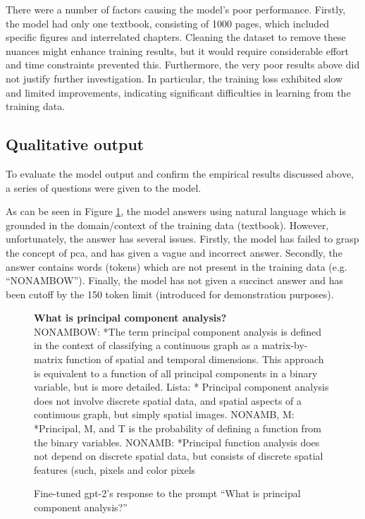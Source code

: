 There were a number of factors causing the model's poor performance. Firstly, the model had only one textbook, consisting of 1000 pages, which included specific figures and interrelated chapters. Cleaning the dataset to remove these nuances might enhance training results, but it would require considerable effort and time constraints prevented this. Furthermore, the very poor results above did not justify further investigation. In particular, the training loss exhibited slow and limited improvements, indicating significant difficulties in learning from the training data.

\subsection{Qualitative output}
To evaluate the model output and confirm the empirical results discussed above, a series of questions were given to the model.

As can be seen in Figure \ref{fig:results_mlm_ex1}, the model answers using natural language which is grounded in the domain/context of the training data (textbook). However, unfortunately, the answer has several issues. Firstly, the model has failed to grasp the concept of \acrfull{pca}, and has given a vague and incorrect answer. Secondly, the answer contains words (tokens) which are not present in the training data (e.g. ``NONAMBOW''). Finally, the model has not given a succinct answer and has been cutoff by the 150 token limit (introduced for demonstration purposes). 

\begin{figure}[h]
    \begin{itquote}
        \textbf{What is principal component analysis?} \\ NONAMBOW: *The term principal component analysis is defined in the context of classifying a continuous graph as a matrix-by-matrix function of spatial and temporal dimensions. This approach is equivalent to a function of all principal components in a binary variable, but is more detailed. Lista: * Principal component analysis does not involve discrete spatial data, and spatial aspects of a continuous graph, but simply spatial images. NONAMB, M: *Principal, M, and T is the probability of defining a function from the binary variables. NONAMB: *Principal function analysis does not depend on discrete spatial data, but consists of discrete spatial features (such, pixels and color pixels
    \end{itquote}
    \caption{Fine-tuned \acrshort{gpt}-2's response to the prompt ``What is principal component analysis?''}
    \label{fig:results_mlm_ex1}
\end{figure}

